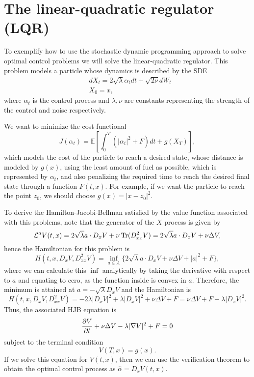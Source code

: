 \section*{The linear-quadratic regulator (LQR)}
To exemplify how to use the stochastic dynamic programming approach to solve optimal control problems we will solve the linear-quadratic regulator. This problem models a particle whose dynamics is described by the SDE
\begin{equation}
	\begin{split}
		&dX_t=2\sqrt{\lambda}\alpha_t dt+\sqrt{2\nu}dW_t\\
		&X_0=x,
	\end{split}
\end{equation} 
where $\alpha_t$ is the control process and $\lambda,\nu$ are constants representing the strength of the control and noise respectively. 

We want to minimize the cost functional
\begin{equation}
	J(\alpha_t)=\mathbb{E}\left[\int_{0}^{T}(|\alpha_t|^2+F) dt +g(X_T)\right],
\end{equation}
which models the cost of the particle to reach a desired state, whose distance is modeled by $g(x)$, using the least amount of fuel as possible, which is represented by $\alpha_t$, and also penalizing the required time to reach the desired final state through a function $F(t,x)$. For example, if we want the particle to reach the point $z_0$, we should choose $g(x)=|x-z_0|^2$.

To derive the Hamilton-Jacobi-Bellman satisfied by the value function associated with this problems, note that the generator of the $X$ process is given by
\begin{equation}
	\mathcal{L}^a V(t,x)=2 \sqrt{\lambda} a\cdot D_x V+\nu\operatorname{Tr}(D_{xx}^2 V)= 2 \sqrt{\lambda}a\cdot D_x V +\nu\Delta V,
\end{equation}
hence the Hamiltonian for this problem is 
\begin{equation}
	H(t,x,D_x V,D_{xx}^2 V)=\inf_{a\in A}\{2 \sqrt{\lambda}a\cdot D_x V +\nu\Delta V+|a|^2+F\},
\end{equation}
where we can calculate this $\inf$ analytically by taking the derivative with respect to $a$ and equating to cero, as the function inside is convex in $a$. Therefore, the minimum is attained at $a=-\sqrt{\lambda}D_x V$ and the Hamiltonian is 
\begin{equation}
	H(t,x,D_x V,D_{xx}^2 V)=-2\lambda|D_x V|^2+\lambda|D_x V|^2+\nu\Delta V+F=\nu\Delta V+F -\lambda |D_x V|^2.
\end{equation}
Thus, the associated HJB equation is 
\begin{equation}
	\frac{\partial V}{\partial t}+\nu\Delta V -\lambda|\nabla V|^2+F=0
\end{equation}
subject to the terminal condition
\begin{equation}
	V(T,x)=g(x).
\end{equation}
If we solve this equation for $V(t,x)$, then we can use the verification theorem to obtain the optimal control process as $\hat{\alpha}=D_x V(t,x)$. 

